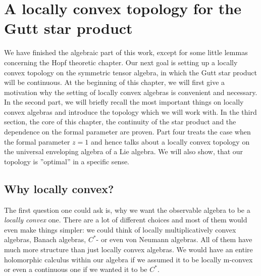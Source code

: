
%
%

\chapter{A locally convex topology for the Gutt star product}

We have finished the algebraic part of this work, except for some little 
lemmas concerning the Hopf theoretic chapter. Our next goal is setting up a 
locally convex topology on the symmetric tensor algebra, in which the Gutt 
star product will be continuous. At the beginning of this chapter, we will 
first give a motivation why the setting of locally convex algebras is 
convenient and necessary. In the second part, we will briefly recall the most 
important things on locally convex algebras and introduce the topology which 
we will work with. In the third section, the core of this chapter, the 
continuity of the star product and the dependence on the formal parameter are 
proven. Part four treats the case when the formal parameter $z = 1$ and hence 
talks about a locally convex topology on the universal enveloping algebra of a 
Lie algebra. We will also show, that our topology is ''optimal'' in a specific 
sense.



\section{Why locally convex?}
\label{sec:chap5_Prelim}

The first question one could ask is, why we want the observable algebra 
to be a \textit{locally convex} one. There are a lot of different choices 
and most of them would even make things simpler: we could think of 
locally multiplicatively convex algebras, Banach algebras, $C^*$- or even 
von Neumann algebras. All of them have much more structure than just 
locally convex algebras. We would have an entire holomorphic calculus 
within our algebra if we assumed it to be locally m-convex or even a 
continuous one if we wanted it to be $C^*$.


